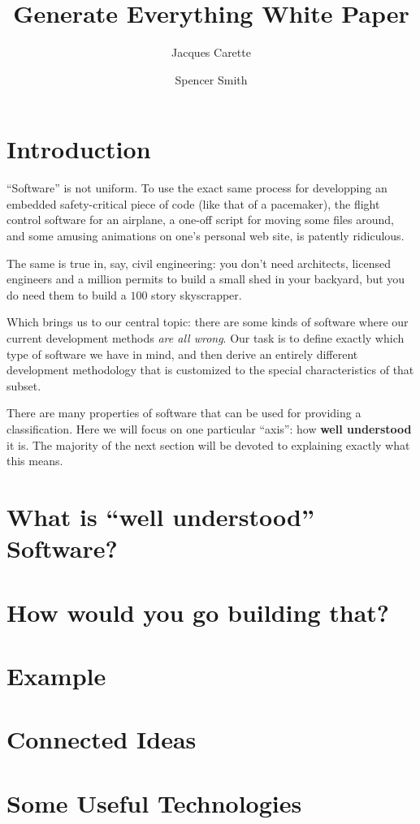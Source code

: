 \documentclass[10pt,twoside,onecolumn,openany,letterpaper]{memoir}
\begin{document}
\title{Generate Everything White Paper}
\author{Jacques Carette \and Spencer Smith}



\maketitle

\chapter{Introduction}

``Software'' is not uniform. To use the exact same process for
developping an embedded safety-critical piece of code (like that of
a pacemaker), the flight control software for an airplane, a one-off
script for moving some files around, and some amusing animations on
one's personal web site, is patently ridiculous.

The same is true in, say, civil engineering: you don't need architects,
licensed engineers and a million permits to build a small shed in your
backyard, but you do need them to build a $100$ story skyscrapper.

Which brings us to our central topic: there are some kinds of software
where our current development methods \emph{are all wrong}. Our task
is to define exactly which type of software we have in mind, and then
derive an entirely different development methodology that is
customized to the special characteristics of that subset.

There are many properties of software that can be used for providing
a classification. Here we will focus on one particular ``axis'': how
\textbf{well understood} it is. The majority of the next section will
be devoted to explaining exactly what this means.

\chapter{What is ``well understood'' Software?}
\chapter{How would you go building that?}
\chapter{Example}
\chapter{Connected Ideas}
\chapter{Some Useful Technologies}
\end{document}

